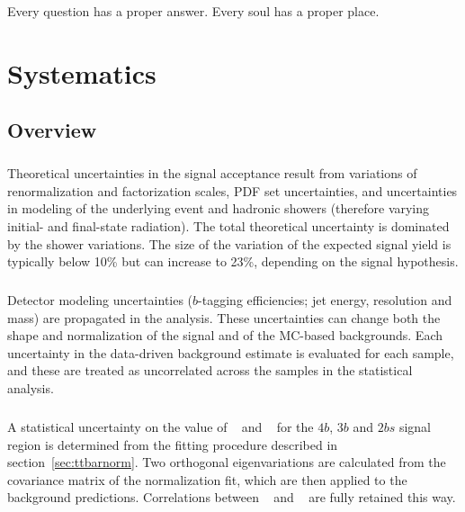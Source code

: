\begin{savequote}[75mm]
Every question has a proper answer. Every soul has a proper place.
\end{savequote}

\chapter{Systematics}
\label{sec:systematics}


\section{Overview}

\paragraph{}
Theoretical uncertainties in the signal acceptance result from variations of renormalization and factorization scales, PDF set uncertainties, and uncertainties in modeling of the underlying event and hadronic showers (therefore varying initial- and final-state radiation).
The total theoretical uncertainty is dominated by the shower variations. 
The size of the variation of the expected signal yield is typically below 10\% but can increase to 23\%, depending on the signal hypothesis.

\paragraph{}
Detector modeling uncertainties ($b$-tagging efficiencies; jet energy, resolution and mass) are propagated in the analysis. 
These uncertainties can change both the shape and normalization of the signal and of the MC-based backgrounds. 
Each uncertainty in the data-driven background estimate is evaluated for each sample, and these are treated as uncorrelated across the samples in the statistical analysis.

\paragraph{}
A statistical uncertainty on the value of \muqcd~ and \alphatt~ for the $4b$, $3b$ and $2bs$ signal region is determined from the fitting procedure described in section~\ref{sec:ttbarnorm}.
Two orthogonal eigenvariations are calculated from the covariance matrix of the normalization fit, which are then applied to the background predictions. 
Correlations between \alphatt~ and \muqcd~ are fully retained this way.

